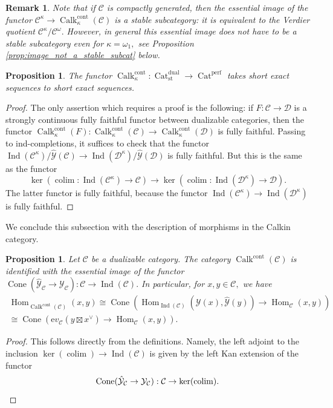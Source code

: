 \documentclass[11pt,leqno]{amsart}
\newtheorem{prop}[theo]{Proposition}
\newtheorem{remark}[theo]{Remark}
\numberwithin{equation}{section}
\def\Hom{\operatorname{Hom}}
\DeclareMathOperator*{\colim}{colim}
\newcommand{\Cat}{\operatorname{Cat}}
\newcommand{\Cone}{\operatorname{Cone}}
\newcommand{\cont}{\operatorname{cont}}
\newcommand{\st}{\operatorname{st}}
\newcommand{\dual}{\operatorname{dual}}
\newcommand{\ev}{\mathrm ev}
\newcommand{\cD}{{\mathcal D}}
\newcommand{\cC}{{\mathcal C}}
\newcommand{\cY}{{\mathcal Y}}
\newcommand{\perf}{\operatorname{perf}}
\newcommand{\Ind}{\operatorname{Ind}}
\newcommand{\Calk}{\operatorname{Calk}}
\begin{document}
\begin{remark}Note that if $\cC$ is compactly generated, then the essential image of the functor $\cC^{\kappa}\to\Calk_{\kappa}^{\cont}(\cC)$ is a stable subcategory: it is equivalent to the Verdier quotient $\cC^{\kappa}/\cC^{\omega}.$ However, in general this essential image does not have to be a stable subcategory even for $\kappa=\omega_1,$ see Proposition \ref{prop:image_not_a_stable_subcat} below.\end{remark}

\begin{prop}\label{prop:exactness_of_Calk} The functor $\Calk_{\kappa}^{\cont}:\Cat_{\st}^{\dual}\to \Cat^{\perf}$ takes short exact sequences to short exact sequences.\end{prop}

\begin{proof}The only assertion which requires a proof is the following: if $F:\cC\to\cD$ is a strongly continuous fully faithful functor between dualizable categories, then the functor $\Calk_{\kappa}^{\cont}(F):\Calk_{\kappa}^{\cont}(\cC)\to \Calk_{\kappa}^{\cont}(\cD)$ is fully faithful. Passing to ind-completions, it suffices to check that the functor $\Ind(\cC^{\kappa})/\hat{\cY}(\cC)\to \Ind(\cD^{\kappa})/\hat{\cY}(\cD)$ is fully faithful. But this is the same as the functor $$\ker(\colim:\Ind(\cC^{\kappa})\to\cC)\to \ker(\colim:\Ind(\cD^{\kappa})\to\cD).$$ The latter functor is fully faithful, because the functor $\Ind(\cC^{\kappa})\to \Ind(\cD^{\kappa})$ is fully faithful.\end{proof}

We conclude this subsection with the description of morphisms in the Calkin category.

\begin{prop}\label{prop:Homs_in_Calk} Let $\cC$ be a dualizable category. The category $\Calk^{\cont}(\cC)$ is identified with the essential image of the functor $\Cone(\hat{\cY}_{\cC}\to\cY_{\cC}):\cC\to\Ind(\cC).$ In particular, for $x,y\in\cC,$ we have
\begin{multline*}\Hom_{\Calk^{\cont}(\cC)}(x,y)\cong\Cone(\Hom_{\Ind(\cC)}(\cY(x),\hat{\cY}(y))\to\Hom_{\cC}(x,y))\\ \cong
\Cone(\ev_{\cC}(y\boxtimes x^{\vee})\to \Hom_{\cC}(x,y)).
\end{multline*}
\end{prop}

\begin{proof}This follows directly from the definitions. Namely, the left adjoint to the inclusion $\ker(\colim)\to\Ind(\cC)$ is given by the left Kan extension of the functor \begin{equation*}\Cone(\hat{\cY}_{\cC}\to\cY_{\cC}):\cC\to \ker(\colim).\qedhere\end{equation*}\end{proof}
\end{document}
